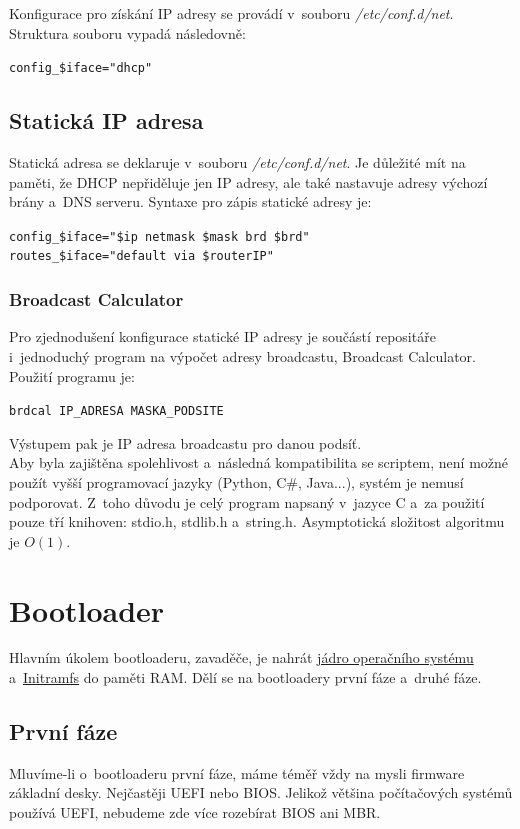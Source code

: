 \documentclass[12pt,a4paper,twoside,]{article}
\begin{document}
{{{{{{\hspace*{-1.5em}Konfigurace pro získání IP adresy se provádí v~souboru \textit{/etc/conf.d/net}. \\Struktura souboru vypadá následovně:

\texttt{config\_\$iface="dhcp"}

\subsection{\textsf{Statická IP adresa}}
Statická adresa se deklaruje v~souboru \textit{/etc/conf.d/net}. Je důležité mít na paměti, že DHCP nepřiděluje jen IP adresy, ale také nastavuje adresy výchozí brány a~DNS serveru. Syntaxe pro zápis statické adresy je:

\texttt{config\_\$iface="\$ip netmask \$mask brd \$brd"}\\
\hspace*{1.5em}\texttt{routes\_\$iface="default via \$routerIP"}
\subsubsection{\textsf{Broadcast Calculator}}
Pro zjednodušení konfigurace statické IP adresy je součástí repositáře i~jednoduchý program na výpočet adresy broadcastu, Broadcast Calculator. Použití programu je:

\texttt{brdcal IP\_ADRESA MASKA\_PODSITE}


\hspace*{-1.5em}Výstupem pak je IP adresa broadcastu pro danou podsíť. \\


Aby byla zajištěna spolehlivost a~následná kompatibilita se scriptem, není možné použít vyšší programovací jazyky (Python, C\#, Java...), systém je nemusí podporovat. Z~toho důvodu je celý program napsaný v~jazyce C a~za použití pouze tří knihoven: stdio.h, stdlib.h a~string.h. Asymptotická složitost algoritmu je $O(1)$.

\newpage
\section{\textsf{Bootloader}}

Hlavním úkolem bootloaderu, zavaděče, je nahrát \hyperlink{Kernel}{jádro operačního systému} a~\hyperlink{Initramfs}{Initramfs} do paměti RAM. Dělí se na bootloadery první fáze a~druhé fáze.
\subsection{\textsf{První fáze}}
Mluvíme-li o~bootloaderu první fáze, máme téměř vždy na mysli firmware základní desky. Nejčastěji UEFI nebo BIOS. Jelikož většina počítačových systémů používá UEFI, nebudeme zde více rozebírat BIOS ani MBR.

}}}}}}
\end{document}
